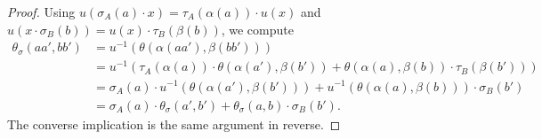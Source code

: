 \documentclass{article}
\theoremstyle{plain}
\theoremstyle{definition}
\begin{document}
\begin{proof}
Using $u(\sigma_A(a)\cdot x)=\tau_A(\alpha(a))\cdot u(x)$ and
$u(x\cdot\sigma_B(b))=u(x)\cdot\tau_B(\beta(b))$, we compute
\begin{align*}
\theta_\sigma(aa',bb')&=u^{-1}\!\left(\theta(\alpha(aa'),\beta(bb'))\right)\\
&=u^{-1}\!\left(\tau_A(\alpha(a))\cdot\theta(\alpha(a'),\beta(b'))+\theta(\alpha(a),\beta(b))\cdot\tau_B(\beta(b'))\right)\\
&=\sigma_A(a)\cdot u^{-1}\!\left(\theta(\alpha(a'),\beta(b'))\right)
+u^{-1}\!\left(\theta(\alpha(a),\beta(b))\right)\cdot\sigma_B(b')\\
&=\sigma_A(a)\cdot\theta_\sigma(a',b')+\theta_\sigma(a,b)\cdot\sigma_B(b').
\end{align*}
The converse implication is the same argument in reverse.
\end{proof}
\end{document}
